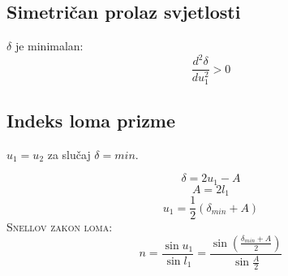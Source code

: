 \documentclass{report}
\begin{document}
\subsection{Simetričan prolaz svjetlosti}
$\delta $ je minimalan:
$$\frac{d^2 \delta}{du^2 _1} > 0$$

\subsection{Indeks loma prizme}

$u_1 = u_2$ za slučaj $\delta = min$.

$$\delta = 2u_1 -A$$
$$A = 2l_1$$
$$u_1 = \frac{1}{2} (\delta _{min} + A)$$
\textsc{Snellov zakon loma:}
$$n = \frac{\sin u_1}{\sin l_1} = \frac{\sin \left ( \frac{\delta _{min} + A}{2} \right )}{\sin \frac{A}{2}}$$
\end{document}
